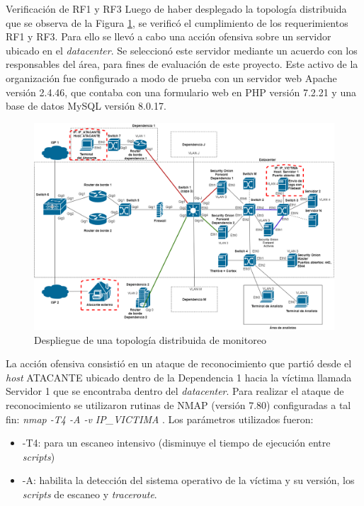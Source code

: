     \begin{section}{Verificación de RF1 y RF3}
    Luego de haber desplegado la topología distribuida que se observa de la Figura \ref{fig:iter1_ver_RF1_RF2}, se verificó el cumplimiento de los requerimientos RF1 y RF3. Para ello se llevó a cabo una acción ofensiva sobre un servidor ubicado en el \textit{datacenter}. Se seleccionó este servidor mediante un acuerdo con los responsables del área, para fines de evaluación de este proyecto. Este activo de la organización fue configurado a modo de prueba con un servidor web Apache versión 2.4.46, que contaba con una formulario web en PHP versión  7.2.21  y una base de datos MySQL versión 8.0.17.\par
    \begin{figure}[H]
    \centering
    \includegraphics[width=1\textwidth]{./iteracion_1_imagenes/Topologia de despliegue descentralizada RF2, RF6 y RF4.png}
    \caption{Despliegue de una topología distribuida de monitoreo}
    \label{fig:iter1_ver_RF1_RF2}
    \end{figure}
    La acción ofensiva consistió en un ataque de reconocimiento que partió desde el \textit{host} ATACANTE ubicado dentro de la Dependencia 1 hacia la víctima llamada Servidor 1 que se encontraba dentro del \textit{datacenter}.
    Para realizar el ataque de reconocimiento se utilizaron rutinas de NMAP \cite{nmap} (versión 7.80) configuradas a tal fin: \textit{nmap -T4 -A -v IP\_VICTIMA} . Los parámetros utilizados fueron:
    \begin{itemize}
    \item -T4: para un escaneo intensivo (disminuye el tiempo de ejecución entre \textit{scripts})
    \item -A: habilita la detección del sistema operativo de la víctima y su versión, los \textit{scripts} de escaneo y \textit{traceroute}.

\end{itemize}
\end{section}

